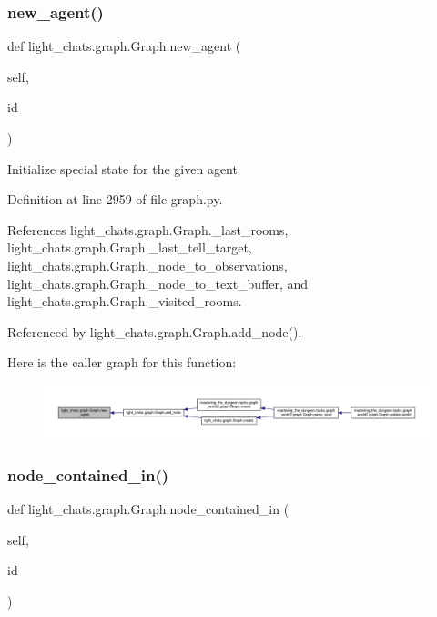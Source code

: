 \subsubsection{\texorpdfstring{new\+\_\+agent()}{new\_agent()}}
{\footnotesize\ttfamily def light\+\_\+chats.\+graph.\+Graph.\+new\+\_\+agent (\begin{DoxyParamCaption}\item[{}]{self,  }\item[{}]{id }\end{DoxyParamCaption})}

\begin{DoxyVerb}Initialize special state for the given agent
\end{DoxyVerb}
 

Definition at line 2959 of file graph.\+py.



References light\+\_\+chats.\+graph.\+Graph.\+\_\+last\+\_\+rooms, light\+\_\+chats.\+graph.\+Graph.\+\_\+last\+\_\+tell\+\_\+target, light\+\_\+chats.\+graph.\+Graph.\+\_\+node\+\_\+to\+\_\+observations, light\+\_\+chats.\+graph.\+Graph.\+\_\+node\+\_\+to\+\_\+text\+\_\+buffer, and light\+\_\+chats.\+graph.\+Graph.\+\_\+visited\+\_\+rooms.



Referenced by light\+\_\+chats.\+graph.\+Graph.\+add\+\_\+node().

Here is the caller graph for this function\+:
\nopagebreak
\begin{figure}[H]
\begin{center}
\leavevmode
\includegraphics[width=350pt]{classlight__chats_1_1graph_1_1Graph_ad9d86fc2b41fef8960a90b517d80cd81_icgraph}
\end{center}
\end{figure}
\mbox{\label{classlight__chats_1_1graph_1_1Graph_a6afbdb89ba9db7f792506d9171f9e287}} 
\subsubsection{\texorpdfstring{node\+\_\+contained\+\_\+in()}{node\_contained\_in()}}
{\footnotesize\ttfamily def light\+\_\+chats.\+graph.\+Graph.\+node\+\_\+contained\+\_\+in (\begin{DoxyParamCaption}\item[{}]{self,  }\item[{}]{id }\end{DoxyParamCaption})}



